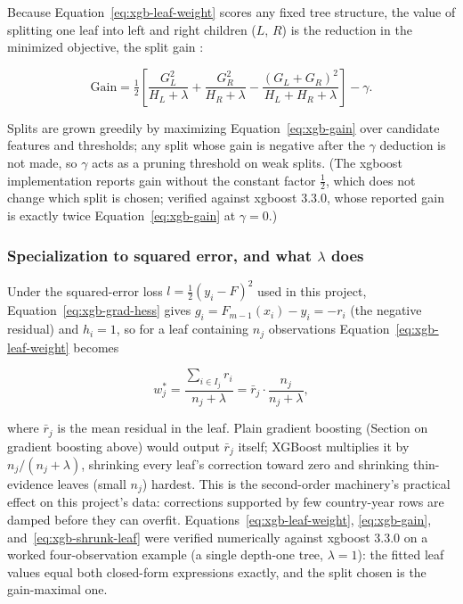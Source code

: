 Because Equation~\ref{eq:xgb-leaf-weight} scores any fixed tree structure,
the value of splitting one leaf into left and right children ($L$, $R$) is
the reduction in the minimized objective, the split gain
\cite{chen2016xgboost}:

\begin{equation}
\label{eq:xgb-gain}
\mathrm{Gain} = \tfrac{1}{2}\left[
\frac{G_L^2}{H_L + \lambda} + \frac{G_R^2}{H_R + \lambda}
- \frac{(G_L + G_R)^2}{H_L + H_R + \lambda}
\right] - \gamma .
\end{equation}

Splits are grown greedily by maximizing Equation~\ref{eq:xgb-gain} over
candidate features and thresholds; any split whose gain is negative after
the $\gamma$ deduction is not made, so $\gamma$ acts as a pruning
threshold on weak splits. (The xgboost implementation reports gain without
the constant factor $\tfrac{1}{2}$, which does not change which split is
chosen; verified against xgboost 3.3.0, whose reported gain is exactly
twice Equation~\ref{eq:xgb-gain} at $\gamma = 0$.)

\subsubsection{Specialization to squared error, and what $\lambda$ does}

Under the squared-error loss $l = \tfrac{1}{2}(y_i - F)^2$ used in this
project, Equation~\ref{eq:xgb-grad-hess} gives
$g_i = F_{m-1}(x_i) - y_i = -r_i$ (the negative residual) and $h_i = 1$,
so for a leaf containing $n_j$ observations Equation~\ref{eq:xgb-leaf-weight}
becomes

\begin{equation}
\label{eq:xgb-shrunk-leaf}
w_j^{*} = \frac{\sum_{i \in I_j} r_i}{n_j + \lambda}
        = \bar r_j \cdot \frac{n_j}{n_j + \lambda},
\end{equation}

where $\bar r_j$ is the mean residual in the leaf. Plain gradient boosting
(Section on gradient boosting above) would output $\bar r_j$ itself;
XGBoost multiplies it by $n_j / (n_j + \lambda)$, shrinking every leaf's
correction toward zero and shrinking thin-evidence leaves (small $n_j$)
hardest. This is the second-order machinery's practical effect on this
project's data: corrections supported by few country-year rows are damped
before they can overfit. Equations~\ref{eq:xgb-leaf-weight},
\ref{eq:xgb-gain}, and~\ref{eq:xgb-shrunk-leaf} were verified numerically
against xgboost 3.3.0 on a worked four-observation example (a single
depth-one tree, $\lambda = 1$): the fitted leaf values equal both
closed-form expressions exactly, and the split chosen is the gain-maximal
one.

